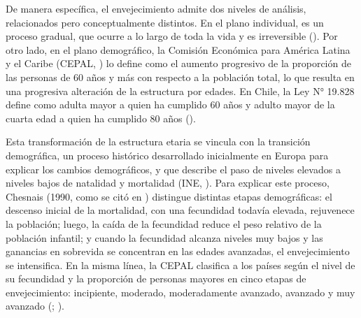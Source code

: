 \documentclass[
  spanish,
  a4paper,
  oneside]{scrbook}
\begin{document}
De manera específica, el envejecimiento admite dos niveles de análisis,
relacionados pero conceptualmente distintos. En el plano individual, es
un proceso gradual, que ocurre a lo largo de toda la vida y es
irreversible (). Por otro lado, en el plano demográfico, la Comisión Económica
para América Latina y el Caribe (CEPAL,
) lo define como el aumento
progresivo de la proporción de las personas de 60 años y más con
respecto a la población total, lo que resulta en una progresiva
alteración de la estructura por edades. En Chile, la Ley N° 19.828
define como adulta mayor a quien ha cumplido 60 años y adulto mayor de
la cuarta edad a quien ha cumplido 80 años ().

Esta transformación de la estructura etaria se vincula con la transición
demográfica, un proceso histórico desarrollado inicialmente en Europa
para explicar los cambios demográficos, y que describe el paso de
niveles elevados a niveles bajos de natalidad y mortalidad (INE,
). Para explicar este proceso,
Chesnais (1990, como se citó en
) distingue
distintas etapas demográficas: el descenso inicial de la mortalidad, con
una fecundidad todavía elevada, rejuvenece la población; luego, la caída
de la fecundidad reduce el peso relativo de la población infantil; y
cuando la fecundidad alcanza niveles muy bajos y las ganancias en
sobrevida se concentran en las edades avanzadas, el envejecimiento se
intensifica. En la misma línea, la CEPAL clasifica a los países según el
nivel de su fecundidad y la proporción de personas mayores en cinco
etapas de envejecimiento: incipiente, moderado, moderadamente avanzado,
avanzado y muy avanzado
(;
).
\end{document}
